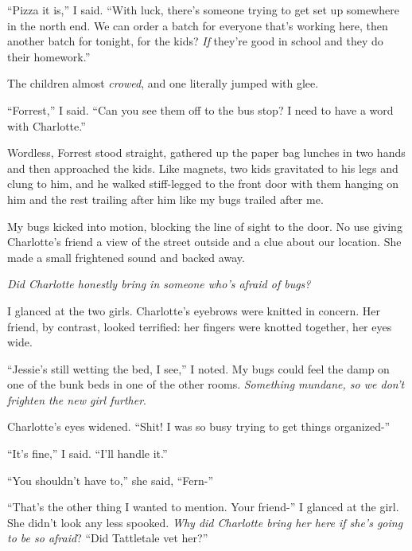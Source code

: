 ``Pizza it is,'' I said.  ``With luck, there's someone trying to get set up somewhere in the north end.  We can order a batch for everyone that's working here, then another batch for tonight, for the kids?  \emph{If} they're good in school and they do their homework.''



The children almost \emph{crowed}, and one literally jumped with glee.



``Forrest,'' I said.  ``Can you see them off to the bus stop?  I need to have a word with Charlotte.''



Wordless, Forrest stood straight, gathered up the paper bag lunches in two hands and then approached the kids.  Like magnets, two kids gravitated to his legs and clung to him, and he walked stiff-legged to the front door with them hanging on him and the rest trailing after him like my bugs trailed after me.



My bugs kicked into motion, blocking the line of sight to the door.  No use giving Charlotte's friend a view of the street outside and a clue about our location.  She made a small frightened sound and backed away.



\emph{Did Charlotte honestly bring in someone who's afraid of bugs?}



I glanced at the two girls.  Charlotte's eyebrows were knitted in concern.  Her friend, by contrast, looked terrified: her fingers were knotted together, her eyes wide.



``Jessie's still wetting the bed, I see,'' I noted.  My bugs could feel the damp on one of the bunk beds in one of the other rooms.  \emph{Something mundane, so we don't frighten the new girl further}.



Charlotte's eyes widened.  ``Shit!  I was so busy trying to get things organized-''



``It's fine,'' I said.  ``I'll handle it.''



``You shouldn't have to,'' she said, ``Fern-''



``That's the other thing I wanted to mention.  Your friend-'' I glanced at the girl.  She didn't look any less spooked.  \emph{Why did Charlotte bring her here if she's going to be so afraid}?  ``Did Tattletale vet her?''




